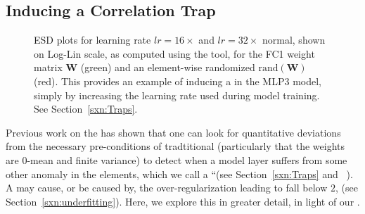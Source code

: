 

\subsection{Inducing a Correlation Trap}
\label{sxn:empirical-correlation_trap}

\begin{figure}[t]
    \centering
    \caption{ESD plots for learning rate $lr=16\times$ and $lr=32\times$ normal, shown on Log-Lin scale, as computed 
    using the \WW tool, for the FC1 weight matrix $\mathbf{W}$ (green) and an element-wise randomized $\mbox{rand}(\mathbf{W})$ (red).  
    This provides an example of inducing a \CorrelationTrap in the MLP3 model, simply by increasing the learning rate used during model training.  
        See Section~\ref{sxn:Traps}.
            }
    \label{fig:mlp3-accuracies3}
\end{figure}


Previous work on the \HTSR \Phenomenology \cite{MM20a_trends_NatComm,MM21a_simpsons_TR} has shown that one can look for 
quantitative deviations from the necessary pre-conditions of tradtitional \RMT (particularly that the weights are 
$0$-mean and finite variance) to detect when a model layer suffers from some other anomaly in the elements, which we 
call a ``\CorrelationTrap (see Section~\ref{sxn:Traps} and ~\cite{MM20a_trends_NatComm,MM21a_simpsons_TR}). A 
\CorrelationTrap may cause, or be caused by, the over-regularization leading \ALPHA to fall below $2$, (see 
Section~\ref{sxn:underfitting}). Here, we explore this in greater detail, in light of our \SETOL.

